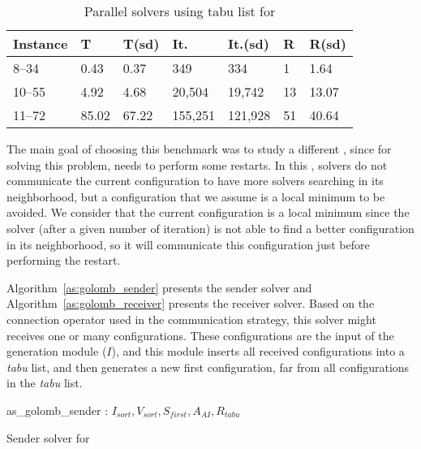 \begin{table}[h]
\centering 
\renewcommand{\arraystretch}{1}
\begin{tabular}{p{2cm}|R{1.2cm}R{1.2cm}|R{1.5cm}R{1.5cm}|R{0.8cm}R{1.2cm}}
	\hline 	
	{\bf Instance} & T & T(sd) & It. & It.(sd) & R & R(sd)\\
	\hline
	8--34 & 0.43 & 0.37 & 349 & 334 & 1 & 1.64\\
	10--55 & 4.92 & 4.68 & 20,504 & 19,742 & 13 & 13.07\\
	11--72 & 85.02 & 67.22 & 155,251 & 121,928 & 51 & 40.64\\
	\hline
\end{tabular}
\caption{Parallel solvers using tabu list for \GRP}
\label{tab:golomb_par_tabu}
\end{table}

\separation

The main goal of choosing this benchmark was to study a different \commstr, since for solving this problem, \posl{} needs to perform some restarts. In this \commstr, solvers do not communicate the current configuration to have more solvers searching in its neighborhood, but a configuration that we assume is a local minimum to be avoided. We consider that the current configuration is a local minimum since the solver (after a given number of iteration) is not able to find a better configuration in its neighborhood, so it will communicate this configuration just before performing the restart. 

Algorithm~\ref{as:golomb_sender} presents the sender solver and Algorithm~\ref{as:golomb_receiver} presents the receiver solver. Based on the connection operator used in the communication strategy, this solver might receives one or many configurations. These configurations are the input of the generation module ($I$), and this module inserts all received configurations into a {\it tabu} list, and then generates a new first configuration, far from all configurations in the {\it tabu} list.

\begin{algorithm}
\dontprintsemicolon
\SetNoline
{}
   as\_golomb\_sender\;
\algoindent {} : $I_{sort}, V_{sort}, S_{first}, A_{AI}, R_{tabu}$ \;
\caption{Sender solver for \GRP}\label{as:golomb_sender}
\end{algorithm}

